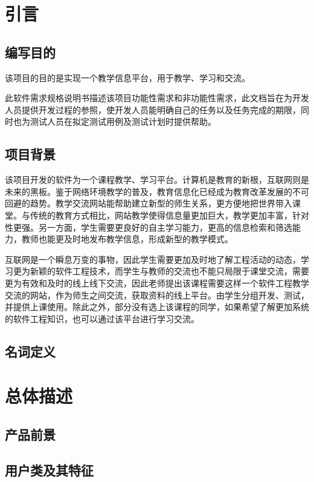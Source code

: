 \documentclass[12pt]{ctexart} %
\begin{document}
\tableofcontents %

\newpage

\section{引言}
\subsection{编写目的}
该项目的目的是实现一个教学信息平台，用于教学、学习和交流。

此软件需求规格说明书描述该项目功能性需求和非功能性需求，此文档旨在为开发人员提供开发过程的参照，使开发人员能明确自己的任务以及任务完成的期限，同时也为测试人员在拟定测试用例及测试计划时提供帮助。

\subsection{项目背景}
该项目开发的软件为一个课程教学、学习平台。计算机是教育的新根，互联网则是未来的黑板。鉴于网络环境教学的普及，教育信息化已经成为教育改革发展的不可回避的趋势。教学交流网站能帮助建立新型的师生关系，更方便地把世界带入课堂。与传统的教育方式相比，网站教学使得信息量更加巨大，教学更加丰富，针对性更强。另一方面，学生需要更良好的自主学习能力，更高的信息检索和筛选能力，教师也能更及时地发布教学信息，形成新型的教学模式。

互联网是一个瞬息万变的事物，因此学生需要更加及时地了解工程活动的动态，学习更为新颖的软件工程技术，而学生与教师的交流也不能只局限于课堂交流，需要更为有效和及时的线上线下交流，因此老师提出该课程需要这样一个软件工程教学交流的网站，作为师生之间交流，获取资料的线上平台。由学生分组开发、测试，并提供上课使用。除此之外，部分没有选上该课程的同学，如果希望了解更加系统的软件工程知识，也可以通过该平台进行学习交流。

\subsection{名词定义}

\section{总体描述}
\subsection{产品前景}

\subsection{用户类及其特征}
\end{document}
